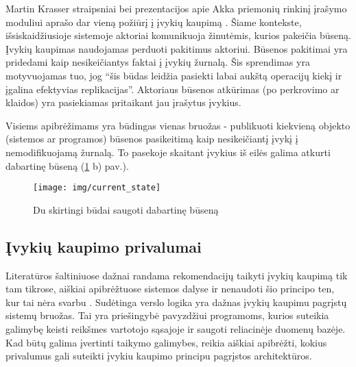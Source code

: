 Martin Krasser straipsniai bei prezentacijos apie Akka priemonių rinkinį įrašymo moduliui aprašo dar vieną požiūrį į įvykių kaupimą \cite{Krasser:AkkaPersistence, Krasser:AkkaYoutube}. Šiame kontekste, išsiskaidžiusioje sistemoje aktoriai komunikuoja žinutėmis, kurios pakeičia būseną. Įvykių kaupimas naudojamas perduoti pakitimus aktoriui. Būsenos pakitimai yra pridedami kaip nesikeičiantys faktai į įvykių žurnalą. Šis sprendimas yra motyvuojamas tuo, jog “šis būdas leidžia pasiekti labai aukštą operacijų kiekį ir įgalina efektyvias replikacijas”. Aktoriaus būsenos atkūrimas (po perkrovimo ar klaidos) yra pasiekiamas pritaikant jau įrašytus įvykius.

Visiems apibrėžimams yra būdingas vienas bruožas - publikuoti kiekvieną objekto (sistemos ar programos) būsenos pasikeitimą kaip nesikeičiantį įvykį į nemodifikuojamą žurnalą. To pasekoje skaitant įvykius iš eilės galima atkurti dabartinę būseną (\ref{img:current_state} b) pav.).

\begin{figure}[H]
    \centering
    \texttt{[image: img/current\_state]}
    \caption{Du skirtingi būdai saugoti dabartinę būseną}
    \label{img:current_state}
\end{figure}

\subsection{Įvykių kaupimo privalumai}

Literatūros šaltiniuose dažnai randama rekomendacijų taikyti įvykių kaupimą tik tam tikrose, aiškiai apibrėžtuose sistemos dalyse ir nenaudoti šio principo ten, kur tai nėra svarbu \cite{Betts:2013:ECE:2509680}. Sudėtinga verslo logika yra dažnas įvykių kaupimu pagrįstų sistemų bruožas. Tai yra priešingybė pavyzdžiui programoms, kurios suteikia galimybę keisti reikšmes vartotojo sąsajoje ir saugoti reliacinėje duomenų bazėje. Kad būtų galima įvertinti taikymo galimybes, reikia aiškiai apibrėžti, kokius privalumus gali suteikti įvykiu kaupimo principu pagrįstos architektūros.

